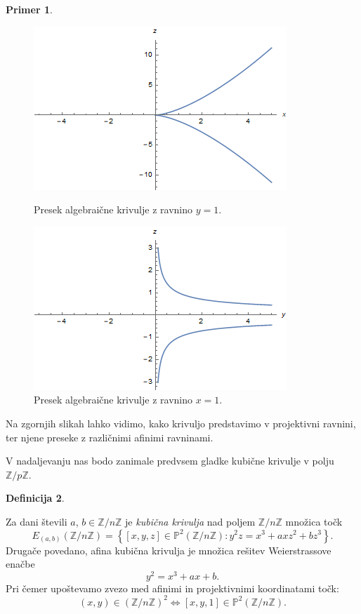 \documentclass[12pt,a4paper,twoside]{article}
\theoremstyle{definition} %
\newtheorem{definicija}{Definicija}[section]
\newtheorem{primer}[definicija]{Primer}
\theoremstyle{plain} %
\numberwithin{equation}{section}  %
\newcommand{\Z}{\mathbb Z}
\newcommand{\PP}{\mathbb P}
\begin{document}
\begin{primer}
\begin{figure}[t]
\centering
\begin{minipage}{.45\textwidth}
\centering
\includegraphics[scale=0.5]{images/projektivnay.png}
\caption[Presek algebraične krivulje z ravnino $y=1$.]{Presek algebraične krivulje z ravnino $y=1$.}
\label{fig:projektivnay}
\end{minipage}%
\hfill
\begin{minipage}{.45\textwidth}
\centering
\includegraphics[scale=0.5]{images/projektivnax.png}
\caption[Presek algebraične krivulje z ravnino $x=1$.]{Presek algebraične krivulje z ravnino $x=1$.}
\label{fig:projektivnax}
\end{minipage}
\end{figure}


Na zgornjih slikah lahko vidimo, kako krivuljo predstavimo v projektivni ravnini, ter njene preseke z različnimi afinimi ravninami.

\end{primer}



V nadaljevanju nas bodo zanimale predvsem gladke kubične krivulje v polju $\mathbb{Z}/p\mathbb{Z}$.

\begin{definicija}~

Za dani števili $a$, $b \in \mathbb{Z}/n\mathbb{Z}$ je \emph{kubična krivulja} nad poljem $\mathbb{Z}/n\mathbb{Z}$ množica točk
$$E_{(a,b)}(\mathbb{Z}/n\mathbb{Z}) =\left\{ [x,y,z] \in \PP^2(\mathbb{Z}/n\mathbb{Z}): y^2z=x^3+axz^2+bz^3 \right\} .$$
Drugače povedano, afina kubična krivulja je množica rešitev Weierstrassove enačbe
$$y^2=x^3+ax+b.$$
Pri čemer upoštevamo zvezo med afinimi in projektivnimi koordinatami točk:
$$(x,y)\in (\Z/n\Z)^2 \Leftrightarrow [x,y,1]\in \PP^2(\Z/n\Z).$$

\end{definicija}
\end{document}
